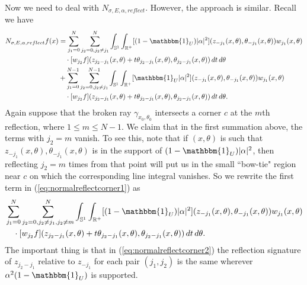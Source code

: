 \documentclass[10pt]{amsart}
\theoremstyle{definition}
\theoremstyle{definition}
\theoremstyle{definition}
\newcommand{ \rn }[1]{\mathbb{R}^{#1}}
\begin{document}
Now we need to deal with $N_{\sigma, E, \alpha, reflect}$. However, the approach is similar. Recall we have
\begin{align}
N_{\sigma, E, \alpha, reflect}f(x) & = \sum_{j_{1}=0}^{N}\sum_{j_{2}=0, j_{2}\neq j_{1}}^{N}\int_{\mathbb{S}^{1}}\int_{\rn{+}}[(1-\mathbbm{1}_{U})|\alpha|^{2}](z_{-j_{1}}(x,\theta),\theta_{-j_{1}}(x,\theta))w_{j_{1}}(x,\theta) \notag\\
& \quad \cdot [w_{j_{2}}f](z_{j_{2}-j_{1}}(x,\theta) + t\theta_{j_{2}-j_{1}}(x,\theta), \theta_{j_{2}-j_{1}}(x,\theta))\, dt \,d\theta \notag\\
& +  \sum_{j_{1}=0}^{N-1}\sum_{j_{2}=0, j_{2}\neq j_{1}}^{N-1}\int_{\mathbb{S}^{1}}\int_{\rn{+}}[\mathbbm{1}_{U}|\alpha|^{2}](z_{-j_{1}}(x,\theta),\theta_{-j_{1}}(x,\theta))w_{j_{1}}(x,\theta) \notag\\
& \quad \cdot [w_{j_{2}}f](z_{j_{2}-j_{1}}(x,\theta) + t\theta_{j_{2}-j_{1}}(x,\theta), \theta_{j_{2}-j_{1}}(x,\theta))\, dt \,d\theta. \label{eq:normalreflectcorner1}
\end{align}
Again suppose that the broken ray $\gamma_{x_{0},\theta_{0}}$ intersects a corner $c$ at the $m$th reflection, where $1 \leq m \leq N-1$. We claim that in the first summation above, the terms with $j_{2} = m$ vanish. To see this, note that if $(x,\theta)$ is such that $z_{-j_{1}}(x,\theta),\theta_{-j_{1}}(x,\theta)$ is in the support of $(1-\mathbbm{1}_{U})|\alpha|^{2}$, then reflecting $j_{2} = m$ times from that point will put us in the small ``bow-tie" region near $c$ on which the corresponding line integral vanishes. So we rewrite the first term in (\ref{eq:normalreflectcorner1}) as
\begin{align}
 & \sum_{j_{1}=0}^{N}\sum_{j_{2}=0, j_{2}\neq j_{1}, j_{2}\neq m}^{N}\int_{\mathbb{S}^{1}}\int_{\rn{+}}[(1-\mathbbm{1}_{U})|\alpha|^{2}](z_{-j_{1}}(x,\theta),\theta_{-j_{1}}(x,\theta))w_{j_{1}}(x,\theta) \notag\\
& \quad \cdot [w_{j_{2}}f](z_{j_{2}-j_{1}}(x,\theta) + t\theta_{j_{2}-j_{1}}(x,\theta), \theta_{j_{2}-j_{1}}(x,\theta))\, dt \,d\theta. \label{eq:normalreflectcorner2}
\end{align}
The important thing is that in (\ref{eq:normalreflectcorner2}) the reflection signature of $z_{j_{2}-j_{1}}$ relative to $z_{-j_{1}}$ for each pair $(j_{1},j_{2})$ is the same wherever $\alpha^{2}(1-\mathbbm{1}_{U})$ is supported. 
\end{document}
